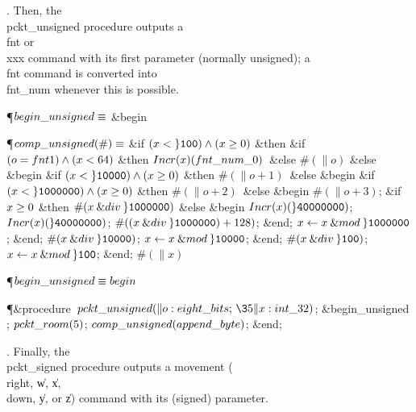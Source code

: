 . Then, the \\{pckt\_unsigned} procedure outputs a \\{fnt} or \\{xxx}
command with its first parameter (normally unsigned); a \\{fnt} command
is converted into \\{fnt\_num} whenever this is possible.

\Y\P\D $\\{begin\_unsigned}\S$ \6
\&{begin} \par
\P\D {}$\\{comp\_unsigned}(\#)\S$\1\6
\&{if} $(\|x<\H{100})\W(\|x\G0)$ \1\&{then}\6
\&{if} $(\|o=\\{fnt1})\W(\|x<64)$ \1\&{then}\5
$\\{Incr}(\|x)(\\{fnt\_num\_0})$\ \&{else} $\#(\|o)$\2\6
\4\&{else} \&{begin} \&{if} $(\|x<\H{10000})\W(\|x\G0)$ \1\&{then}\5
$\#(\|o+1)$\ \&{else} \2\6
\&{begin} \&{if} $(\|x<\H{1000000})\W(\|x\G0)$ \1\&{then}\5
$\#(\|o+2)$\ \&{else} \2\6
\&{begin} $\#(\|o+3)$;\6
\&{if} $\|x\G0$ \1\&{then}\5
$\#(\|x\mathbin{\&{div}}\H{1000000})$\6
\4\&{else} \&{begin} $\\{Incr}(\|x)(\H{40000000})$;\5
$\\{Incr}(\|x)(\H{40000000})$;\5
$\#((\|x\mathbin{\&{div}}\H{1000000})+128)$;\6
\&{end};\2\6
$\|x\K\|x\mathbin{\&{mod}}\H{1000000}$;\6
\&{end};\5
$\#(\|x\mathbin{\&{div}}\H{10000})$;\5
$\|x\K\|x\mathbin{\&{mod}}\H{10000}$;\6
\&{end};\5
$\#(\|x\mathbin{\&{div}}\H{100})$;\5
$\|x\K\|x\mathbin{\&{mod}}\H{100}$;\6
\&{end};\2\2\6
$\#(\|x)$\par
\P\F {}$\\{begin\_unsigned}\S\\{begin}$\par
\Y\P\4\&{procedure}\1\  $\\{pckt\_unsigned}(\|o:\\{eight\_bits};\,\35\|x:%
\\{int\_32})$;\2\6
\&{begin\_unsigned} ;\5
$\\{pckt\_room}(5)$;\5
$\\{comp\_unsigned}(\\{append\_byte})$;\6
\&{end};\par
\fi

. Finally, the \\{pckt\_signed} procedure outputs a movement (\\{right}, %
\|w,
\|x, \\{down}, \|y, or \|z) command with its (signed) parameter.

